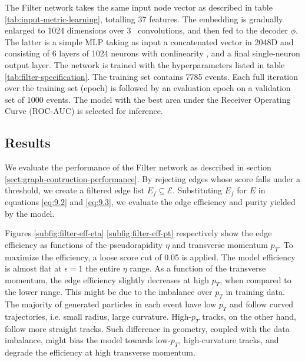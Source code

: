 The Filter network takes the same input node vector as described in table \ref{tab:input-metric-learning}, totalling 37 features. 
The embedding is gradually enlarged to 1024 dimensions over 3 \graphsage~convolutions, and then fed to the decoder $\phi$. 
The latter is a simple MLP taking as input a concatenated vector in 2048D and consisting of 6 layers of 1024 neurons with \relu nonlinearity \cite{relu}, and a final single-neuron output layer. 
The network is trained with the hyperparameters listed in table \ref{tab:filter-specification}. 
The training set contains 7785 events. Each full iteration over the training set (epoch) is followed by an evaluation epoch on a validation set of 1000 events. 
The model with the best area under the Receiver Operating Curve (ROC-AUC) is selected for inference.

\subsection{Results}
\label{sect:filter-results}
We evaluate the performance of the Filter network as described in section \ref{sect:graph-contruction-performance}. 
By rejecting edges whose score falls under a threshold, we create a filtered edge list $E_f\subseteq \mathcal{E}$. 
Substituting $E_f$ for $E$ in equations \eqref{eq:9.2} and \eqref{eq:9.3}, we evaluate the edge efficiency and purity yielded by the model. 

Figures \ref{subfig:filter-eff-eta} \ref{subfig:filter-eff-pt} respectively show the edge efficiency as functions of the pseudorapidity $\eta$ and transverse momentum $p_T$. 
To maximize the efficiency, a loose score cut of 0.05 is applied. 
The model efficiency is almost flat at $\epsilon=1$ the entire $\eta$ range. 
As a function of the transverse momentum, the edge efficiency slightly decreases at high $p_T$, when compared to the lower range. 
This might be due to the imbalance over $p_T$ in training data.
The majority of generated particles in each event have low $p_T$ and follow curved trajectories, i.e. small radius, large curvature. 
High-$p_T$ tracks, on the other hand, follow more straight tracks.
Such difference in geometry, coupled with the data imbalance, might bias the model towards low-$p_T$, high-curvature tracks, and degrade the efficiency at high transverse momentum.

